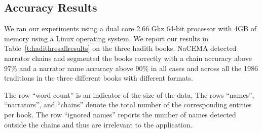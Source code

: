 \documentclass[a4,12pt]{report}
\begin{document}
\subsection{Accuracy Results}

\begin{table}[bt]
\centering
\caption{Results of the hadith case study with Sarf.}
{}
\normalsize
\label{t:hadithresallresults}
\end{table}

We ran our experiments using a dual core 2.66 Ghz 64-bit processor 
with 4GB of memory using a Linux operating system. 
We report our results in Table~\ref{t:hadithresallresults} on the 
three hadith books.
NaCEMA detected narrator chains and segmented the books 
correctly with a chain accuracy above 97\% and a narrator name
accuracy above 90\%
in all cases and across all the 1986 traditions in the three 
different books with different formats. 

The row ``word count'' is an indicator of the size of the data.
The %
rows ``names'', ``narrators'', and ``chains'' denote the total
number of the corresponding entities per book.
The row ``ignored names'' reports the number of names detected 
outside the chains and thus are irrelevant to
the application. 
\end{document}
